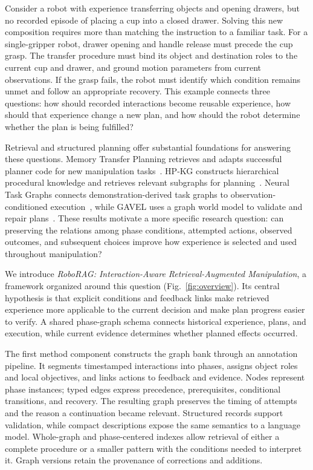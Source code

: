 \documentclass[10pt,twocolumn,letterpaper]{article}
\begin{document}
Consider a robot with experience transferring objects and opening drawers, but no recorded episode of placing a cup into a closed drawer. Solving this new composition requires more than matching the instruction to a familiar task. For a single-gripper robot, drawer opening and handle release must precede the cup grasp. The transfer procedure must bind its object and destination roles to the current cup and drawer, and ground motion parameters from current observations. If the grasp fails, the robot must identify which condition remains unmet and follow an appropriate recovery. This example connects three questions: how should recorded interactions become reusable experience, how should that experience change a new plan, and how should the robot determine whether the plan is being fulfilled?

Retrieval and structured planning offer substantial foundations for answering these questions. Memory Transfer Planning retrieves and adapts successful planner code for new manipulation tasks~\cite{mtp2025}. HP-KG constructs hierarchical procedural knowledge and retrieves relevant subgraphs for planning~\cite{hpkg2025}. Neural Task Graphs connects demonstration-derived task graphs to observation-conditioned execution~\cite{ntg2019}, while GAVEL uses a graph world model to validate and repair plans~\cite{gavel2026}. These results motivate a more specific research question: can preserving the relations among phase conditions, attempted actions, observed outcomes, and subsequent choices improve how experience is selected and used throughout manipulation?

We introduce \emph{RoboRAG: Interaction-Aware Retrieval-Augmented Manipulation}, a framework organized around this question (Fig.~\ref{fig:overview}). Its central hypothesis is that explicit conditions and feedback links make retrieved experience more applicable to the current decision and make plan progress easier to verify. A shared phase-graph schema connects historical experience, plans, and execution, while current evidence determines whether planned effects occurred.

The first method component constructs the graph bank through an annotation pipeline. It segments timestamped interactions into phases, assigns object roles and local objectives, and links actions to feedback and evidence. Nodes represent phase instances; typed edges express precedence, prerequisites, conditional transitions, and recovery. The resulting graph preserves the timing of attempts and the reason a continuation became relevant. Structured records support validation, while compact descriptions expose the same semantics to a language model. Whole-graph and phase-centered indexes allow retrieval of either a complete procedure or a smaller pattern with the conditions needed to interpret it. Graph versions retain the provenance of corrections and additions.
\end{document}
